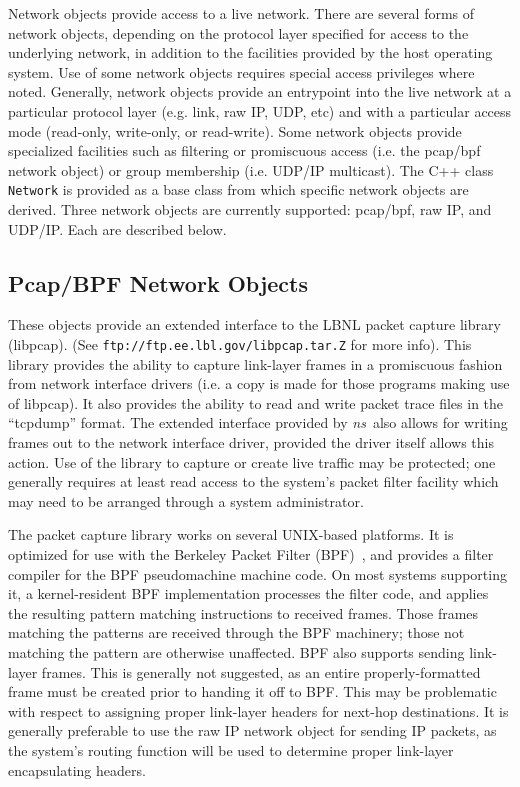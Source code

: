 Network objects provide access to a live network.
There are several forms of network objects, depending on the
protocol layer specified for access to the underlying network,
in addition to the facilities provided by the host operating system.
Use of some network objects requires special access
privileges where noted.
Generally, network objects provide an entrypoint into the live
network at a particular protocol layer (e.g. link, raw IP, UDP, etc)
and with a particular access mode (read-only, write-only, or read-write).
Some network objects provide specialized facilities such as filtering
or promiscuous access (i.e. the pcap/bpf network object)
or group membership (i.e. UDP/IP multicast).
The C++ class {\tt Network} is provided as a base class from
which specific network objects are derived.
Three network objects are currently supported: pcap/bpf, raw IP,
and UDP/IP.
Each are described below.

\subsection{Pcap/BPF Network Objects}

These objects provide an extended interface to the LBNL packet capture
library (libpcap).
(See {\tt ftp://ftp.ee.lbl.gov/libpcap.tar.Z} for more info).
This library provides the ability to capture link-layer frames
in a promiscuous fashion from network interface drivers
(i.e. a copy is made for those programs making use of libpcap).
It also provides the ability to read and write packet trace
files in the ``tcpdump'' format.
The extended interface provided by \emph{ns}~also allows for writing
frames out to the network interface driver, provided the driver
itself allows this action.
Use of the library to capture or create live traffic may be protected;
one generally requires at least read access to the system's packet filter
facility which may need to be arranged through a system administrator.

The packet capture library works on several UNIX-based platforms.
It is optimized for use with the
Berkeley Packet Filter (BPF)~\cite{BPF93},
and provides a filter compiler for the BPF pseudomachine machine code.
On most systems supporting it,
a kernel-resident BPF implementation processes the filter code, and 
applies the resulting pattern matching instructions to received frames.
Those frames matching the patterns are received through the BPF machinery;
those not matching the pattern are otherwise unaffected.
BPF also supports sending link-layer frames.
This is generally not suggested, as an entire properly-formatted frame
must be created prior to handing it off to BPF.
This may be problematic with respect to assigning proper link-layer headers
for next-hop destinations.
It is generally preferable to use the raw IP network object for sending
IP packets, as the system's routing function will be used to determine
proper link-layer encapsulating headers.

